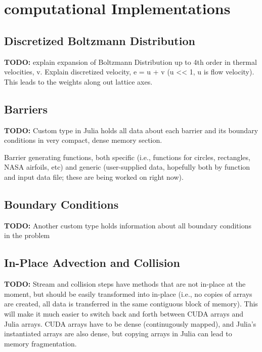 \documentclass[twoside]{article}
\begin{document}
\section{computational Implementations}

\subsection*{Discretized Boltzmann Distribution}

\noindent \textbf{TODO:} explain expansion of Boltzmann Distribution up to 4th order in thermal velocities, v. Explain discretized velocity, e = u + v (u << 1, u is flow velocity). This leads to the weights along out lattice axes.\\


\subsection*{Barriers}

\noindent \textbf{TODO:} Custom type in Julia holds all data about each barrier and its boundary conditions in very compact, dense memory section.

\noindent Barrier generating functions, both specific (i.e., functions for circles, rectangles, NASA airfoils, etc) and generic (user-supplied data, hopefully both by function and input data file; these are being worked on right now).\\


\subsection*{Boundary Conditions}

\noindent \textbf{TODO:} Another custom type holds information about all boundary conditions in the problem\\



\subsection*{In-Place Advection and Collision}

\noindent \textbf{TODO:} Stream and collision steps have methods that are not in-place at the moment, but should be easily transformed into in-place (i.e., no copies of arrays are created, all data is transferred in the same contiguous block of memory). This will make it much easier to switch back and forth between CUDA arrays and Julia arrays. CUDA arrays have to be dense (continugously mapped), and Julia's instantiated arrays are also dense, but copying arrays in Julia can lead to memory fragmentation.\\
\end{document}
